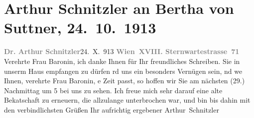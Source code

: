 

               \section[Arthur Schnitzler an Bertha von Suttner, 24. 10. 1913]{ Arthur Schnitzler an Bertha von Suttner,
                    24. 10. 1913}\nopagebreak{}\rehead{ }\begin{ledgroupsized}[t]{13cm}\normalsize\beginnumbering{} \toendnotes[C]{\smallbreak\pagebreak[2]} 
\toendnotes[C]{\smallbreak}\pstart
           \noindent{}{\pb}\textcolor{gray}{\textbf{Dr. Arthur Schnitzler}}\hfill 24. X. 913\pend
           \pstart
           \textcolor{gray}{\textbf{Wien XVIII. Sternwartestrasse 71}}\pend
           \pstart{}Verehrte Frau Baronin,\pend\pstart
           ich danke Ihnen für Ihr freundliches Schreiben. Sie in unserm Haus empfangen zu
                    dürfen rd uns ein besonders Vernügen sein, nd we{\geminationn} Ihnen, verehrte Frau Baronin,
                        e Zeit passt, so hoffen wir Sie {\pb}am \introOben{}nächsten\introOben{}{ }\label{K_L02154_1v}\label{K_L02154_1h}{ }\introOben{}(29.)\introOben{} Nachmittag um 5 bei uns
                    zu sehen.\pend
           \pstart
           Ich freue mich sehr darauf eine alte Beka{\geminationn}tschaft zu
                    erneuern, die allzulange unterbrochen war, und bin bis dahin mit den
                    verbindlichsten Grüßen Ihr aufrichtig ergebener\pend
           \pstart \spacefill\mbox{Arthur Schnitzler}\pend{}          \endnumbering{}\end{ledgroupsized}  \newcommand{\dateiname}{L02154}\newcommand{\titel}{Arthur Schnitzler an Bertha von Suttner, 24. 10. 1913}\newcommand{\editorInnen}{Martin Anton Müller und Gerd-Hermann Susen}
            \footnotesize
\begin{ledgroupsized}[t]{11.5cm}
\end{ledgroupsized}
         
      